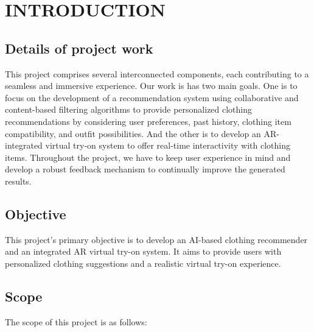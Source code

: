 \chapter{INTRODUCTION}

\section{Details of project work}
	This project comprises several interconnected components, each contributing to a seamless and immersive experience. Our work is has two main goals. One is to focus on the development of a recommendation system using collaborative and content-based filtering algorithms to provide personalized clothing recommendations by considering user preferences, past history, clothing item compatibility, and outfit possibilities. And the other is to develop an AR-integrated virtual try-on system to offer real-time interactivity with clothing items. Throughout the project, we have to keep user experience in mind and develop a robust feedback mechanism to continually improve the generated results.

\section{Objective}
	This project's primary objective is to develop an AI-based clothing recommender and an integrated AR virtual try-on system. It aims to provide users with personalized clothing suggestions and a realistic virtual try-on experience.

\section{Scope}
	The scope of this project is as follows:

